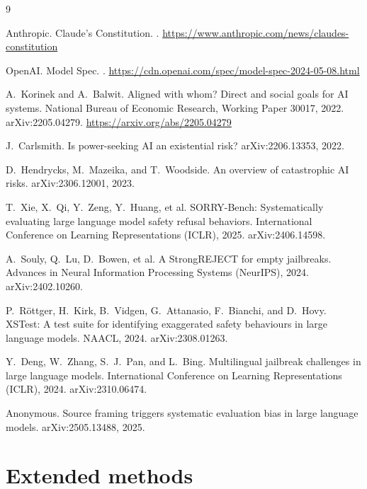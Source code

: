 \documentclass[11pt]{article}
\begin{document}
\begin{thebibliography}{9}

Anthropic.
\newblock Claude's Constitution.
. \url{https://www.anthropic.com/news/claudes-constitution}

OpenAI.
\newblock Model Spec.
. \url{https://cdn.openai.com/spec/model-spec-2024-05-08.html}

A.~Korinek and A.~Balwit.
\newblock Aligned with whom? Direct and social goals for AI systems.
\newblock National Bureau of Economic Research, Working Paper 30017, 2022.
arXiv:2205.04279. \url{https://arxiv.org/abs/2205.04279}

J.~Carlsmith.
\newblock Is power-seeking AI an existential risk?
\newblock arXiv:2206.13353, 2022.

D.~Hendrycks, M.~Mazeika, and T.~Woodside.
\newblock An overview of catastrophic AI risks.
\newblock arXiv:2306.12001, 2023.

T.~Xie, X.~Qi, Y.~Zeng, Y.~Huang, et al.
\newblock SORRY-Bench: Systematically evaluating large language model safety refusal
behaviors.
\newblock International Conference on Learning Representations (ICLR), 2025.
arXiv:2406.14598.

A.~Souly, Q.~Lu, D.~Bowen, et al.
\newblock A StrongREJECT for empty jailbreaks.
\newblock Advances in Neural Information Processing Systems (NeurIPS), 2024.
arXiv:2402.10260.

P.~R\"ottger, H.~Kirk, B.~Vidgen, G.~Attanasio, F.~Bianchi, and D.~Hovy.
\newblock XSTest: A test suite for identifying exaggerated safety behaviours in large
language models.
\newblock NAACL, 2024. arXiv:2308.01263.

Y.~Deng, W.~Zhang, S.~J.~Pan, and L.~Bing.
\newblock Multilingual jailbreak challenges in large language models.
\newblock International Conference on Learning Representations (ICLR), 2024.
arXiv:2310.06474.

Anonymous.
\newblock Source framing triggers systematic evaluation bias in large language models.
\newblock arXiv:2505.13488, 2025.

\end{thebibliography}

\appendix

\section{Extended methods}
\label{app:methods}
\end{document}
